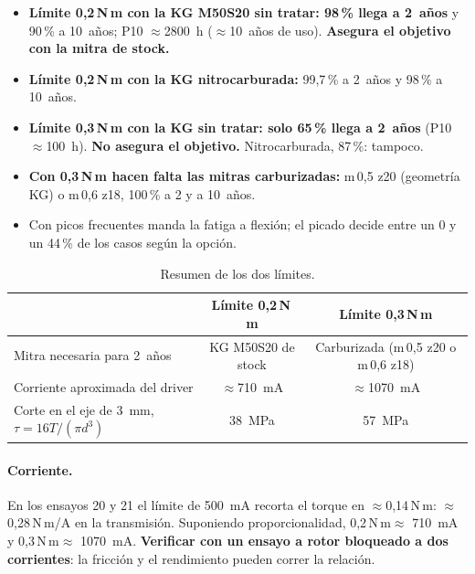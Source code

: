 \documentclass[11pt,a4paper]{article}
\newcommand{\Nm}{\,N\,m\xspace}
\begin{document}
\begin{itemize}
  \item \textbf{Límite 0,2\Nm con la KG M50S20 sin tratar: 98\,\% llega a 2~años} y 90\,\% a 10~años; P10 $\approx$2800~h
        ($\approx$10~años de uso). \textbf{Asegura el objetivo con la mitra de stock.}
  \item \textbf{Límite 0,2\Nm con la KG nitrocarburada:} 99,7\,\% a 2~años y 98\,\% a 10~años.
  \item \textbf{Límite 0,3\Nm con la KG sin tratar: solo 65\,\% llega a 2~años} (P10 $\approx$100~h). \textbf{No asegura el
        objetivo.} Nitrocarburada, 87\,\%: tampoco.
  \item \textbf{Con 0,3\Nm hacen falta las mitras carburizadas:} m\,0,5 z20 (geometría KG) o m\,0,6 z18, 100\,\% a 2 y a 10~años.
  \item Con picos frecuentes manda la fatiga a flexión; el picado decide entre un 0 y un 44\,\% de los casos según la opción.
\end{itemize}

\begin{table}[H]\centering\small\setlength{\tabcolsep}{4pt}
\begin{tabular}{l cc}
\toprule
 & Límite 0,2\Nm & Límite 0,3\Nm\\\midrule
Mitra necesaria para 2~años & KG M50S20 de stock & Carburizada (m\,0,5 z20 o m\,0,6 z18)\\
Corriente aproximada del driver & $\approx$710~mA & $\approx$1070~mA\\
Corte en el eje de 3~mm, $\tau=16T/(\pi d^3)$ & 38~MPa & 57~MPa\\
\bottomrule
\end{tabular}
\caption{Resumen de los dos límites.}
\end{table}

\paragraph{Corriente.} En los ensayos 20 y 21 el límite de 500~mA recorta el torque en $\approx$0,14\Nm: $\approx$0,28\Nm/A
en la transmisión. Suponiendo proporcionalidad, 0,2\Nm $\approx$ 710~mA y 0,3\Nm $\approx$ 1070~mA.
\textbf{Verificar con un ensayo a rotor bloqueado a dos corrientes}: la fricción y el rendimiento pueden correr la relación.
\end{document}
